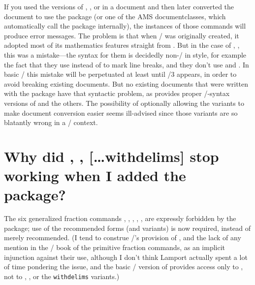 \documentclass{amsdtx}
\begin{document}
If you used the  versions of , , or
 in a document and then later converted the document to use the
 package (or one of the AMS documentclasses, which
automatically call the  package internally), the instances
of those commands will produce error messages. The problem
is that when \latex/ was originally created, it adopted most of its
mathematics features straight from . But in the case of
, ,  this was a mistake---the 
syntax for them is decidedly non-\latex/ in style, for example the fact
that they use  instead of \cn{\\} to mark line breaks, and they
don't use  and . In basic \latex/ this mistake will be
perpetuated at least until \latex/3 appears, in order to avoid breaking
existing documents. But no existing documents that were written with the
 package have that syntactic problem, as 
provides proper \latex/-syntax versions of  and the others.
The possibility of optionally allowing the  variants to
make document conversion easier seems ill-advised since those variants
are so blatantly wrong in a \latex/ context.

\section{Why did , ,  [\dots{\ntt withdelims}]
 stop working when I added the  package?}

The six generalized fraction commands , ,
, , ,  are
expressly forbidden by the  package; use of the recommended
forms  (and variants) is now required, instead of merely
recommended. (I tend to construe \latex/'s provision of , and
the lack of any mention in the \latex/ book of the primitive fraction
commands, as an implicit injunction against their use, although I don't
think Lamport actually spent a lot of time pondering the issue, and the
basic \latex/ version of  provides access only to ,
not to , , or the \verb'withdelims' variants.)
\end{document}

